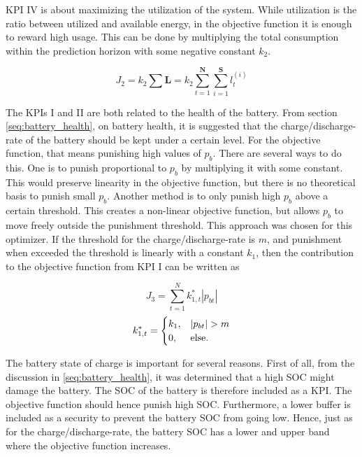 KPI IV is about maximizing the utilization of the system. While utilization is the ratio between utilized and available energy, in the objective function it is enough to reward high usage. This can be done by multiplying the total consumption within the prediction horizon with some negative constant $\mathit{k_2}$.

\begin{equation}
    J_2 = k_2\sum\mathbf{L} = k_2\sum_{t=1}^{\mathbf{N}} \sum_{i=1}^{\mathbf{S}} l_t^{(i)}
\end{equation}

The KPIs I and II are both related to the health of the battery. From section \ref{seq:battery_health}, on battery health, it is suggested that the charge/discharge-rate of the battery should be kept under a certain level. For the objective function, that means punishing high values of $p_b$. There are several ways to do this. One is to punish proportional to $p_b$ by multiplying it with some constant. This would preserve linearity in the objective function, but there is no theoretical basis to punish small $p_b$. Another method is to only punish high $p_b$ above a certain threshold. This creates a non-linear objective function, but allows $p_b$ to move freely outside the punishment threshold. This approach was chosen for this optimizer. If the threshold for the charge/discharge-rate is $m$, and punishment when exceeded the threshold is linearly with a constant $k_1$, then the contribution to the objective function from KPI I can be written as

\begin{equation}
    J_3 = \sum_{t=1}^{N}{k_{1,t}^*|p_{bt}|}
\end{equation}
\begin{equation}
    k_{1,t}^* =  \begin{cases}
            k_1,& |p_{bt}|>m\\
            0, & \text{else}.
            \end{cases}
            \notag
\end{equation}

The battery state of charge is important for several reasons. First of all, from the discussion in \ref{seq:battery_health}, it was determined that a high SOC might damage the battery. The SOC of the battery is therefore included as a KPI. The objective function should hence punish high SOC. Furthermore, a lower buffer is included as a security to prevent the battery SOC from going low. Hence, just as for the charge/discharge-rate, the battery SOC has a lower and upper band where the objective function increases.\\

